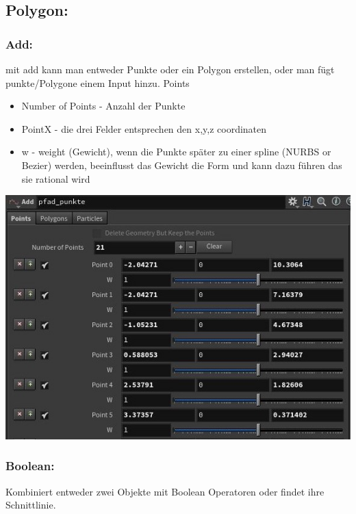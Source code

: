 \subsection*{​Polygon:}
\subsubsection*{​Add:}
mit add kann man entweder Punkte oder ein Polygon erstellen, oder man fügt punkte/Polygone einem Input hinzu.
Points		
\begin{itemize}
\item Number of Points - Anzahl der Punkte
\item PointX	- die drei Felder entsprechen den x,y,z coordinaten
\item w - weight (Gewicht), wenn die Punkte später zu einer spline (NURBS or Bezier) werden, beeinflusst das Gewicht die Form und kann dazu führen das sie rational wird
\end{itemize}
\includegraphics*[width=\textwidth]{graphics/add.JPG}

\subsubsection*{​Boolean:}
Kombiniert entweder zwei Objekte mit Boolean Operatoren oder findet ihre Schnittlinie.

